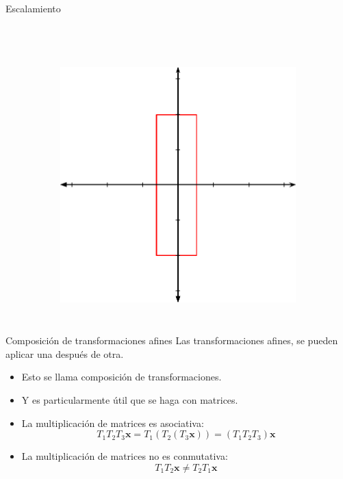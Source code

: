 \begin{frame}{Escalamiento}
\begin{columns}
\begin{figure}[htp]
\begin{subfigure}[b]{0.4\textwidth}
 \end{subfigure}
\\
\vspace{0.15cm}
 \begin{subfigure}[b]{0.4\textwidth}
   \includegraphics[width=\textwidth]{img/Scalated}
 \end{subfigure}
\end{figure}
\end{columns}
\end{frame}

\begin{frame}{Composición de transformaciones afines}
Las transformaciones afines, se pueden aplicar una después de otra. 
\begin{itemize}
    \item Esto se llama \alert{composición de transformaciones}.
    \item Y es particularmente útil que se haga con matrices.
    \item La multiplicación de matrices es asociativa:
    $$T_1 T_2 T_3 \mathbf{x} = T_1 (T_2 (T_3 \mathbf{x})) = (T_1 T_2 T_3) \mathbf{x}$$
    \item La multiplicación de matrices no es conmutativa: 
    $$T_1 T_2 \mathbf{x} \neq T_2 T_1 \mathbf{x}$$
\end{itemize}
\end{frame}

